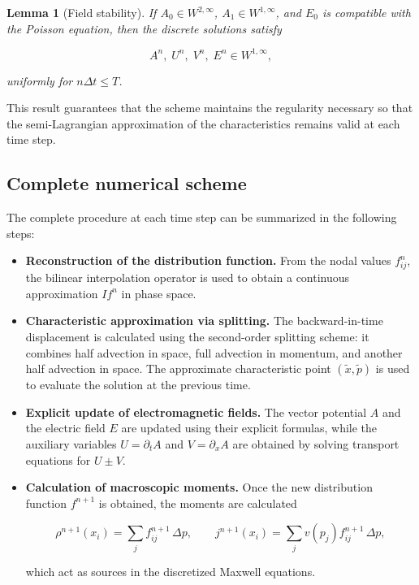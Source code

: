 \documentclass[11pt,a4paper,twoside,pdf]{article}
\numberwithin{equation}{section}
\newtheorem{lemma}[theorem]{Lemma}
\begin{document}
\begin{lemma}[Field stability]
If $A_0\in W^{2,\infty}$, $A_1\in W^{1,\infty}$, and $E_0$ is compatible with the Poisson equation, then the discrete solutions satisfy


\[
A^n,\; U^n,\; V^n,\; E^n \in W^{1,\infty},
\]


uniformly for $n\Delta t\le T$.
\end{lemma}

This result guarantees that the scheme maintains the regularity necessary so that the semi-Lagrangian approximation of the characteristics remains valid at each time step.

\medskip




\subsection{Complete numerical scheme}

The complete procedure at each time step can be summarized in the following steps:

\begin{itemize}
\item \textbf{Reconstruction of the distribution function.}
From the nodal values $f^n_{ij}$, the bilinear interpolation operator is used to obtain a continuous approximation $I f^n$ in phase space.


\item \textbf{Characteristic approximation via splitting.}
The backward-in-time displacement is calculated using the second-order splitting scheme: it combines half advection in space, full advection in momentum, and another half advection in space.
The approximate characteristic point $(\tilde{x},\tilde{p})$ is used to evaluate the solution at the previous time.

\item \textbf{Explicit update of electromagnetic fields.}
The vector potential $A$ and the electric field $E$ are updated using their explicit formulas, while the auxiliary variables $U=\partial_t A$ and $V=\partial_x A$ are obtained by solving transport equations for $U\pm V$.


\item \textbf{Calculation of macroscopic moments.}
Once the new distribution function $f^{n+1}$ is obtained, the moments are calculated


\[
\rho^{n+1}(x_i)=\sum_j f^{n+1}_{ij}\,\Delta p, \qquad
j^{n+1}(x_i)=\sum_j v(p_j)f^{n+1}_{ij}\,\Delta p,
\]


which act as sources in the discretized Maxwell equations.
\end{itemize}
\end{document}
